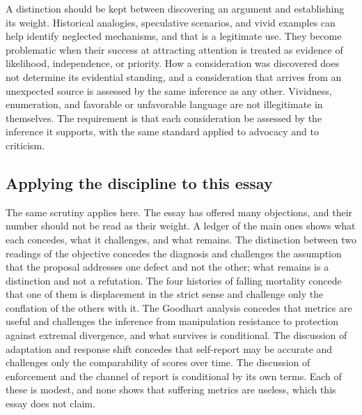 \documentclass[11pt]{article}
\begin{document}
A distinction should be kept between discovering an argument and establishing its weight. Historical analogies, speculative scenarios, and vivid examples can help identify neglected mechanisms, and that is a legitimate use. They become problematic when their success at attracting attention is treated as evidence of likelihood, independence, or priority. How a consideration was discovered does not determine its evidential standing, and a consideration that arrives from an unexpected source is assessed by the same inference as any other. Vividness, enumeration, and favorable or unfavorable language are not illegitimate in themselves. The requirement is that each consideration be assessed by the inference it supports, with the same standard applied to advocacy and to criticism.

\subsection{Applying the discipline to this essay}

The same scrutiny applies here. The essay has offered many objections, and their number should not be read as their weight. A ledger of the main ones shows what each concedes, what it challenges, and what remains. The distinction between two readings of the objective concedes the diagnosis and challenges the assumption that the proposal addresses one defect and not the other; what remains is a distinction and not a refutation. The four histories of falling mortality concede that one of them is displacement in the strict sense and challenge only the conflation of the others with it. The Goodhart analysis concedes that metrics are useful and challenges the inference from manipulation resistance to protection against extremal divergence, and what survives is conditional. The discussion of adaptation and response shift concedes that self-report may be accurate and challenges only the comparability of scores over time. The discussion of enforcement and the channel of report is conditional by its own terms. Each of these is modest, and none shows that suffering metrics are useless, which this essay does not claim.
\end{document}
